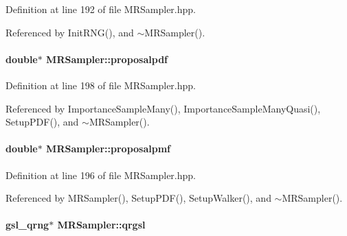 \-Definition at line 192 of file \-M\-R\-Sampler.\-hpp.



\-Referenced by \-Init\-R\-N\-G(), and $\sim$\-M\-R\-Sampler().

\hypertarget{classMRSampler_ad32ae929145a5d9a1b042aaf4bd34952}{
\paragraph[{proposalpdf}]{\setlength{\rightskip}{0pt plus 5cm}double$\ast$ {\bf \-M\-R\-Sampler\-::proposalpdf}}}\label{classMRSampler_ad32ae929145a5d9a1b042aaf4bd34952}


\-Definition at line 198 of file \-M\-R\-Sampler.\-hpp.



\-Referenced by \-Importance\-Sample\-Many(), \-Importance\-Sample\-Many\-Quasi(), \-Setup\-P\-D\-F(), and $\sim$\-M\-R\-Sampler().

\hypertarget{classMRSampler_a0019552cda42dbc57e0bbf88b661fbce}{
\paragraph[{proposalpmf}]{\setlength{\rightskip}{0pt plus 5cm}double$\ast$ {\bf \-M\-R\-Sampler\-::proposalpmf}}}\label{classMRSampler_a0019552cda42dbc57e0bbf88b661fbce}


\-Definition at line 196 of file \-M\-R\-Sampler.\-hpp.



\-Referenced by \-M\-R\-Sampler(), \-Setup\-P\-D\-F(), \-Setup\-Walker(), and $\sim$\-M\-R\-Sampler().

\hypertarget{classMRSampler_a3045790ee467171c7ed5b1a7520457f6}{
\paragraph[{qrgsl}]{\setlength{\rightskip}{0pt plus 5cm}gsl\-\_\-qrng$\ast$ {\bf \-M\-R\-Sampler\-::qrgsl}}}\label{classMRSampler_a3045790ee467171c7ed5b1a7520457f6}


